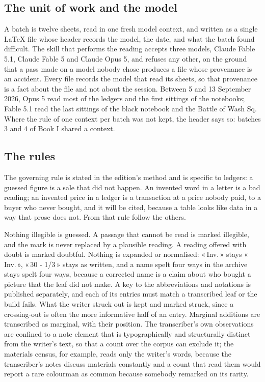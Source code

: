 \documentclass[11pt]{article}
\newcommand{\q}[1]{«\,#1\,»}
\begin{document}
\subsection{The unit of work and the model}

A batch is twelve sheets, read in one fresh model context, and written as a single LaTeX file whose header records the model, the date, and what the batch found difficult. The skill that performs the reading accepts three models, Claude Fable 5.1, Claude Fable 5 and Claude Opus 5, and refuses any other, on the ground that a pass made on a model nobody chose produces a file whose provenance is an accident. Every file records the model that read its sheets, so that provenance is a fact about the file and not about the session. Between 5 and 13 September 2026, Opus 5 read most of the ledgers and the first sittings of the notebooks; Fable 5.1 read the last sittings of the black notebook and the Battle of Wash Sq. Where the rule of one context per batch was not kept, the header says so: batches 3 and 4 of Book I shared a context.

\subsection{The rules}

The governing rule is stated in the edition's method and is specific to ledgers: a guessed figure is a sale that did not happen. An invented word in a letter is a bad reading; an invented price in a ledger is a transaction at a price nobody paid, to a buyer who never bought, and it will be cited, because a table looks like data in a way that prose does not. From that rule follow the others.

Nothing illegible is guessed. A passage that cannot be read is marked illegible, and the mark is never replaced by a plausible reading. A reading offered with doubt is marked doubtful. Nothing is expanded or normalised: \q{Inv.} stays \q{Inv.}, \q{30 - 1/3} stays as written, and a name spelt four ways in the archive stays spelt four ways, because a corrected name is a claim about who bought a picture that the leaf did not make. A key to the abbreviations and notations is published separately, and each of its entries must match a transcribed leaf or the build fails. What the writer struck out is kept and marked struck, since a crossing-out is often the more informative half of an entry. Marginal additions are transcribed as marginal, with their position. The transcriber's own observations are confined to a note element that is typographically and structurally distinct from the writer's text, so that a count over the corpus can exclude it; the materials census, for example, reads only the writer's words, because the transcriber's notes discuss materials constantly and a count that read them would report a rare colourman as common because somebody remarked on its rarity.
\end{document}
